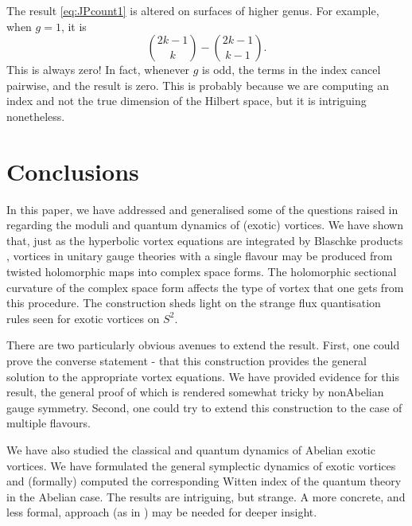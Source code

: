\documentclass[10pt]{article}
\theoremstyle{definition}
\begin{document}
The result \eqref{eq:JPcount1} is altered on surfaces of higher genus. For example, when \(g=1\), it is
\[
{2k -1 \choose k} - {2k-1 \choose k-1} \text{.}
\]
This is always zero! In fact, whenever \(g\) is odd, the terms in the index cancel pairwise, and the result is zero. This is probably because we are computing an index and not the true dimension of the Hilbert space, but it is intriguing nonetheless.





\section{Conclusions}
\label{sec:conc}

In this paper, we have addressed and generalised some of the questions raised in \cite{doroudSA} regarding the moduli and quantum dynamics of (exotic) vortices. We have shown that, just as the hyperbolic vortex equations are integrated by Blaschke products \cite{wittenMPS}, vortices in unitary gauge theories with a single flavour may be produced from twisted holomorphic maps into complex space forms. The holomorphic sectional curvature of the complex space form affects the type of vortex that one gets from this procedure. 
The construction sheds light on the strange flux quantisation rules seen for exotic vortices on \(S^2\). 

There are two particularly obvious avenues to extend the result. First, one could prove the converse statement - that this construction provides the general solution to the appropriate vortex equations. We have provided evidence for this result, the general proof of which is rendered somewhat tricky by nonAbelian gauge symmetry. Second, one could try to extend this construction to the case of multiple flavours.

We have also studied the classical and quantum dynamics of Abelian exotic vortices. We have formulated the general symplectic dynamics of exotic vortices and (formally) computed the corresponding Witten index of the quantum theory in the Abelian case. The results are intriguing, but strange. A more concrete, and less formal, approach (as in \cite{turnerQO}) may be needed for deeper insight.
\end{document}
